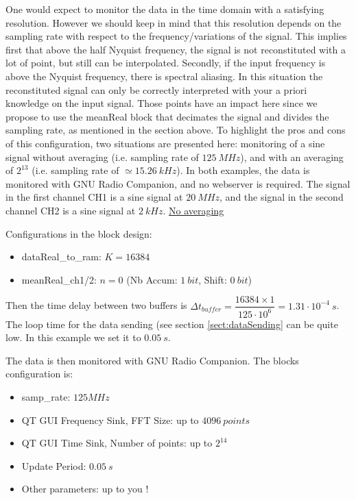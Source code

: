 \documentclass[12pt,oneside]{article}
\begin{document}
One would expect to monitor the data in the time domain with a satisfying resolution. However we should keep in mind that this resolution depends on the sampling rate with respect to the frequency/variations of the signal. This implies first that above the half Nyquist frequency, the signal is not reconstituted with a lot of point, but still can be interpolated. Secondly, if the input frequency is above the Nyquist frequency, there is spectral aliasing. In this situation the reconstituted signal can only be correctly interpreted with your a priori knowledge on the input signal. 
\newline\newline
Those points have an impact here since we propose to use the meanReal block that decimates the signal and divides the sampling rate, as mentioned in the section above. To highlight the pros and cons of this configuration, two situations are presented here: monitoring of a sine signal without averaging (i.e. sampling rate of $125~MHz$), and with an averaging of $2^{13}$ (i.e. sampling rate of $\simeq 15.26~kHz$).
\newline\newline
In both examples, the data is monitored with GNU Radio Companion, and no webserver is required. The signal in the first channel CH1 is a sine signal at $20~MHz$, and the signal in the second channel CH2 is a sine signal at $2~kHz$.
\newline\newline
\underline{No averaging}\newline

Configurations in the block design: 
\begin{itemize}
	\setlength\itemsep{-0.2cm}
	\item dataReal\_to\_ram: $K=16384$
	\item meanReal\_ch1/2: $n=0$ (Nb Accum: $1~bit$, Shift: $0~bit$)
\end{itemize}

Then the time delay between two buffers is $\Delta t_{buffer}=\dfrac{16384\times 1}{125\cdot10^6}=1.31\cdot10^{-4}~s$. The loop time for the data sending (see section \ref{sect:dataSending} can be quite low. In this example we set it to $0.05~s$.
\newline

The data is then monitored with GNU Radio Companion. The blocks configuration is:
\begin{itemize}
	\setlength\itemsep{-0.2cm}
	\item samp\_rate: $125MHz$
	\item QT GUI Frequency Sink, FFT Size: up to $4096~points$
	\item QT GUI Time Sink, Number of points: up to $2^{14}$
	\item Update Period: $0.05~s$
	\item Other parameters: up to you !
\end{itemize}
\vspace{0.4cm}
\end{document}
